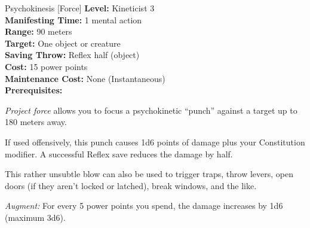 {Psychokinesis [Force]}
{
	\textbf{Level:}
	Kineticist 3\\
	\textbf{Manifesting Time:}
	1 mental action\\
	\textbf{Range:}
	90 meters\\
	\textbf{Target:}
	One object or creature\\
	\textbf{Saving Throw:}
	Reflex half (object)\\
	\textbf{Cost:}
	15 power points\\
	\textbf{Maintenance Cost:}
	None (Instantaneous)\\
	\textbf{Prerequisites:}
	\\
}
{
	\emph{Project force} allows you to focus a psychokinetic ``punch'' against a target up to 180 meters away.

	If used offensively, this punch causes 1d6 points of damage plus your Constitution modifier. A successful Reflex save reduces the damage by half.

	This rather unsubtle blow can also be used to trigger traps, throw levers, open doors (if they aren't locked or latched), break windows, and the like.

	\textit{Augment:} For every 5 power points you spend, the damage increases by 1d6 (maximum 3d6).
}